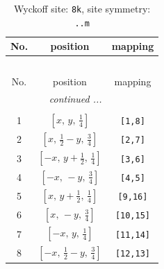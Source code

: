 \documentclass[fleqn,8pt]{jsarticle}
\begin{document}
\begin{longtable}{ccc}
\caption{Wyckoff site: {\tt 8k}, site symmetry: {\tt ..m}}
 \\
 \hline \hline
No. & position & mapping \\ \hline \endfirsthead

\multicolumn{2}{l}{\tablename\ \thetable{}} \\
 \hline \hline
No. & position & mapping \\ \hline \endhead

 \hline \hline
\multicolumn{2}{r}{\footnotesize\it continued ...} \\ \endfoot

 \hline \hline
\multicolumn{2}{r}{} \\ \endlastfoot

1 & $\left[ x,\, y,\, \frac{1}{4} \right]$ & {\tt [1,8]} \\ \hline
2 & $\left[ x,\, \frac{1}{2} - y,\, \frac{3}{4} \right]$ & {\tt [2,7]} \\ \hline
3 & $\left[ - x,\, y + \frac{1}{2},\, \frac{1}{4} \right]$ & {\tt [3,6]} \\ \hline
4 & $\left[ - x,\, - y,\, \frac{3}{4} \right]$ & {\tt [4,5]} \\ \hline
5 & $\left[ x,\, y + \frac{1}{2},\, \frac{1}{4} \right]$ & {\tt [9,16]} \\ \hline
6 & $\left[ x,\, - y,\, \frac{3}{4} \right]$ & {\tt [10,15]} \\ \hline
7 & $\left[ - x,\, y,\, \frac{1}{4} \right]$ & {\tt [11,14]} \\ \hline
8 & $\left[ - x,\, \frac{1}{2} - y,\, \frac{3}{4} \right]$ & {\tt [12,13]} \\
\end{longtable}
\renewcommand{\arraystretch}{1.2}
\end{document}
